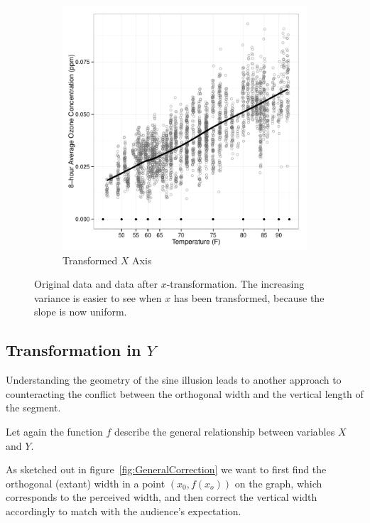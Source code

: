 \documentclass[11pt]{isuthesis}\usepackage[]{graphicx}\usepackage[]{color}
\begin{document}
\begin{figure}[h!]
\begin{subfigure}[b]{.48\textwidth}
\includegraphics[keepaspectratio=TRUE,width=\textwidth]{fig-xtrans-example2}
\caption{Transformed $X$ Axis}\label{fig:xtrans-example-trans}
\end{subfigure}
\caption[Original data and data after X transformation]{Original data and data after $x$-transformation. The increasing variance is easier to see when $x$ has been transformed, because the slope is now uniform.\label{fig:xtrans-example}}
\end{figure}


\subsection{Transformation in $Y$}
Understanding the geometry of the sine illusion leads to another approach to counteracting  the conflict between the orthogonal width and the vertical length of the segment. 



Let again the function $f$ describe the general relationship between variables $X$ and $Y$. 


As sketched out in figure~\ref{fig:GeneralCorrection} we want to first find the orthogonal (extant) width in a point $(x_0, f(x_o))$ on the graph, which corresponds to the  perceived width, and then correct the vertical width accordingly to match with the audience's expectation.
\end{document}
